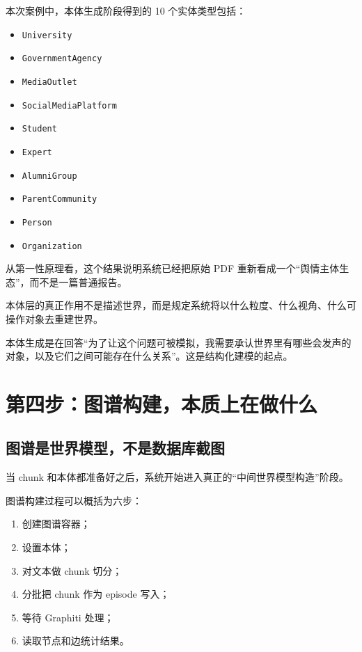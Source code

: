 \documentclass[UTF8,10pt,oneside]{ctexbook}
\newcommand{\code}[1]{\nolinkurl{#1}}
\begin{document}
本次案例中，本体生成阶段得到的 10 个实体类型包括：

\begin{itemize}
  \item \code{University}
  \item \code{GovernmentAgency}
  \item \code{MediaOutlet}
  \item \code{SocialMediaPlatform}
  \item \code{Student}
  \item \code{Expert}
  \item \code{AlumniGroup}
  \item \code{ParentCommunity}
  \item \code{Person}
  \item \code{Organization}
\end{itemize}

从第一性原理看，这个结果说明系统已经把原始 PDF 重新看成一个“舆情主体生态”，而不是一篇普通报告。

\begin{definitionbox}[本体层的真正作用]
本体层的真正作用不是描述世界，而是规定系统将以什么粒度、什么视角、什么可操作对象去重建世界。
\end{definitionbox}

\begin{takeawaybox}[本章核心结论]
本体生成是在回答“为了让这个问题可被模拟，我需要承认世界里有哪些会发声的对象，以及它们之间可能存在什么关系”。这是结构化建模的起点。
\end{takeawaybox}

\chapter{第四步：图谱构建，本质上在做什么}

\section{图谱是世界模型，不是数据库截图}

当 chunk 和本体都准备好之后，系统开始进入真正的“中间世界模型构造”阶段。

图谱构建过程可以概括为六步：

\begin{enumerate}
  \item 创建图谱容器；
  \item 设置本体；
  \item 对文本做 chunk 切分；
  \item 分批把 chunk 作为 episode 写入；
  \item 等待 Graphiti 处理；
  \item 读取节点和边统计结果。
\end{enumerate}
\end{document}

